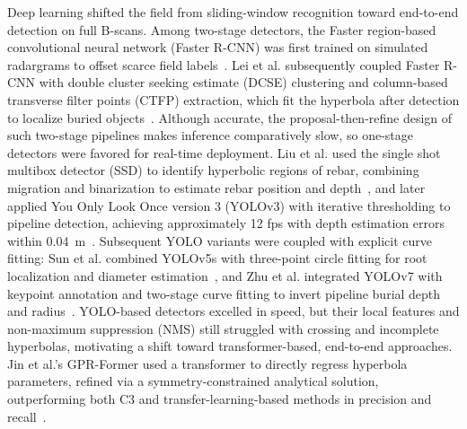 \documentclass[lettersize,journal]{IEEEtran}
\begin{document}
Deep learning shifted the field from sliding-window recognition toward
end-to-end detection on full B-scans. Among two-stage detectors, the Faster
region-based convolutional neural network (Faster R-CNN) was first trained on
simulated radargrams to offset scarce field labels~\cite{pham2018fasterrcnn}.
Lei et al. subsequently coupled Faster R-CNN with double cluster seeking
estimate (DCSE) clustering and column-based transverse filter points (CTFP)
extraction, which fit the hyperbola after detection to localize buried
objects~\cite{lei2019autohyperbola}. Although accurate, the proposal-then-refine
design of such two-stage pipelines makes inference comparatively slow, so
one-stage detectors were favored for real-time deployment. Liu et al. used the
single shot multibox detector (SSD) to identify hyperbolic regions of rebar,
combining migration and binarization to estimate rebar position and
depth~\cite{LIU2020103279}, and later applied You Only Look Once version 3
(YOLOv3) with iterative thresholding to pipeline detection, achieving
approximately 12 fps with depth estimation errors within
0.04~m~\cite{liu2022pipeline}. Subsequent YOLO variants were coupled with
explicit curve fitting: Sun et al. combined YOLOv5s with three-point circle
fitting for root localization and diameter estimation~\cite{agronomy13020344},
and Zhu et al. integrated YOLOv7 with keypoint annotation and two-stage curve
fitting to invert pipeline burial depth and radius~\cite{rs15082114}. YOLO-based
detectors excelled in speed, but their local features and non-maximum
suppression (NMS) still struggled with crossing and incomplete hyperbolas,
motivating a shift toward transformer-based, end-to-end approaches. Jin et al.'s
GPR-Former used a transformer to directly regress hyperbola parameters, refined
via a symmetry-constrained analytical solution, outperforming both C3 and
transfer-learning-based methods in precision and recall~\cite{jin2024gprformer}.
\end{document}
